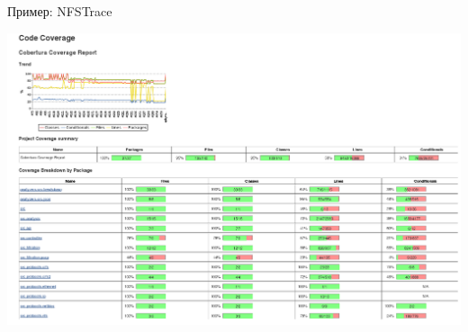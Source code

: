 \begin{frame}{Пример: NFSTrace}
  \begin{center}
    \includegraphics[height=0.9\textheight]{../../slides/profile/nfs-trace-coverage-html.png}
  \end{center}
\end{frame}

